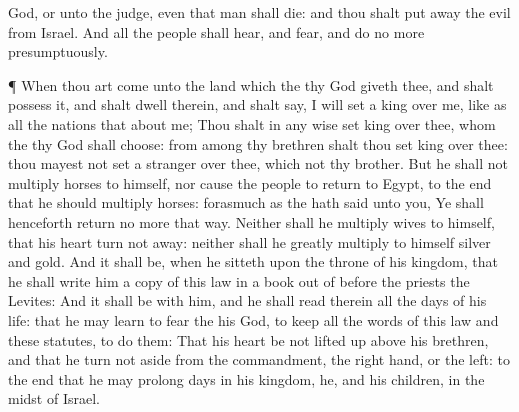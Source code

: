 {God, or unto the
judge, even that
man shall
die: and thou shalt put
away the
evil from
Israel.
And all the
people shall
hear, and
fear, and do no more
presumptuously.
\par }{\PP {}¶ When thou art
come unto the
land which the
{} thy
God
giveth thee, and shalt
possess it, and shalt
dwell therein, and shalt
say, I will
set a
king over me, like as all the
nations that
{}
about me;
Thou shalt in any
wise
set
{}
king over thee, whom the
{} thy
God shall
choose:
{} from
among thy
brethren shalt thou
set
king over thee: thou
mayest not
set a
stranger over thee, which
{} not thy
brother.
But he shall not
multiply
horses to himself, nor cause the
people to
return to
Egypt, to the end that he should
multiply
horses: forasmuch as the
{} hath
said unto you, Ye shall
henceforth
return no more that
way.
Neither shall he
multiply
wives to himself, that his
heart
turn not away: neither shall he
greatly
multiply to himself
silver and
gold.
And it shall be, when he
sitteth upon the
throne of his
kingdom, that he shall
write him a
copy of this
law in a
book out of
{}
before the
priests the
Levites:
And it shall be with him, and he shall
read therein all the
days of his
life: that he may
learn to
fear the
{} his
God, to
keep all the
words of this
law and these
statutes, to
do them:
That his
heart be not lifted
up above his
brethren, and that he turn not
aside from the
commandment,
{} the right
hand, or
{} the
left: to the end that he may
prolong
{}
days in his
kingdom, he, and his
children, in the
midst of
Israel.

}
